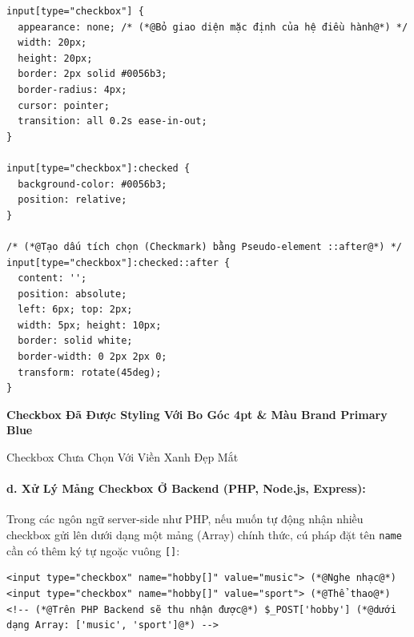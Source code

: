 \documentclass[11pt,oneside]{book}
\newcommand{\codeinline}[1]{\textcolor{accentOrange}{\texttt{#1}}}
\begin{document}
\begin{codeWindow}
\begin{lstlisting}[language=HTML5]
input[type="checkbox"] {
  appearance: none; /* (*@Bỏ giao diện mặc định của hệ điều hành@*) */
  width: 20px;
  height: 20px;
  border: 2px solid #0056b3;
  border-radius: 4px;
  cursor: pointer;
  transition: all 0.2s ease-in-out;
}

input[type="checkbox"]:checked {
  background-color: #0056b3;
  position: relative;
}

/* (*@Tạo dấu tích chọn (Checkmark) bằng Pseudo-element ::after@*) */
input[type="checkbox"]:checked::after {
  content: '';
  position: absolute;
  left: 6px; top: 2px;
  width: 5px; height: 10px;
  border: solid white;
  border-width: 0 2px 2px 0;
  transform: rotate(45deg);
}
\end{lstlisting}
\end{codeWindow}

\begin{browserWindow}
\sffamily\small
{} \;\textbf{Checkbox Đã Được Styling Với Bo Góc 4pt \& Màu Brand Primary Blue} \\[5pt]
 \; Checkbox Chưa Chọn Với Viền Xanh Đẹp Mắt
\end{browserWindow}

\paragraph{d. Xử Lý Mảng Checkbox Ở Backend (PHP, Node.js, Express):}
Trong các ngôn ngữ server-side như PHP, nếu muốn tự động nhận nhiều checkbox gửi lên dưới dạng một mảng (Array) chính thức, cú pháp đặt tên \codeinline{name} cần có thêm ký tự ngoặc vuông \codeinline{[]}:

\begin{codeWindow}
\begin{lstlisting}[language=HTML5]
<input type="checkbox" name="hobby[]" value="music"> (*@Nghe nhạc@*)
<input type="checkbox" name="hobby[]" value="sport"> (*@Thể thao@*)
<!-- (*@Trên PHP Backend sẽ thu nhận được@*) $_POST['hobby'] (*@dưới dạng Array: ['music', 'sport']@*) -->
\end{lstlisting}
\end{codeWindow}
\end{document}
